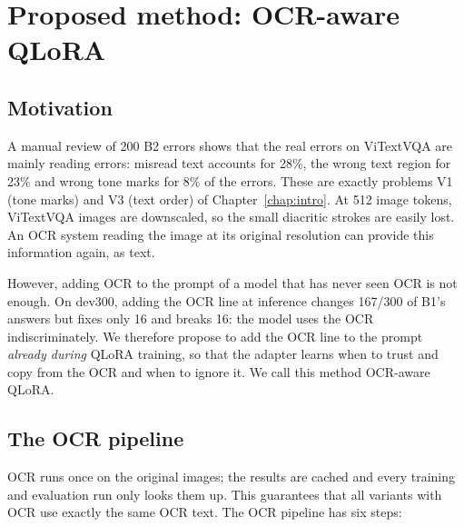 \section{Proposed method: OCR-aware QLoRA}
\label{sec:met-ocr}

\subsection{Motivation}

A manual review of 200 B2 errors shows that the real errors on ViTextVQA are mainly
reading errors: misread text accounts for 28\%, the wrong text region for 23\% and wrong
tone marks for 8\% of the errors. These are exactly problems V1 (tone marks) and V3 (text
order) of Chapter~\ref{chap:intro}. At 512 image tokens, ViTextVQA images are downscaled,
so the small diacritic strokes are easily lost. An OCR system reading the image at its
original resolution can provide this information again, as text.

However, adding OCR to the prompt of a model that has never seen OCR is not enough. On
dev300, adding the OCR line at inference changes 167/300 of B1's answers but fixes only
16 and breaks 16: the model uses the OCR indiscriminately. We therefore propose to
add the OCR line to the prompt \emph{already during} QLoRA training, so that the adapter
learns when to trust and copy from the OCR and when to ignore it. We call this
method OCR-aware QLoRA.

\subsection{The OCR pipeline}
\label{sec:met-ocrpipe}

OCR runs once on the original images; the results are cached and every training and
evaluation run only looks them up. This guarantees that all variants with OCR use exactly
the same OCR text. The OCR pipeline has six steps:

